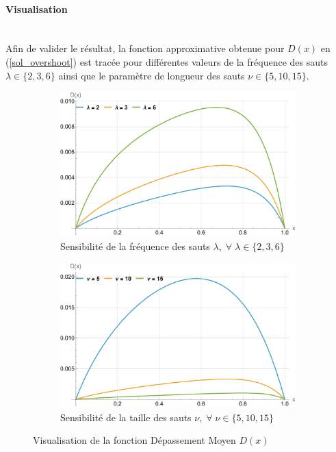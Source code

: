 \paragraph{Visualisation}\phantom{}\\
Afin de valider le résultat, la fonction approximative obtenue pour $D(x)$ en (\ref{sol_overshoot}) est tracée pour différentes valeurs de la fréquence des sauts $\lambda\in\{2,3,6\}$ ainsi que le paramètre de longueur des sauts $\nu\in\{5,10,15\}$.
\begin{figure}[htb]
    \centering
    \begin{subfigure}{0.45\linewidth}
        \includegraphics[width=\linewidth]{img/validation/Ovs/overshoot_lambda.pdf}
        \caption{Sensibilité de la fréquence des sauts $\lambda,\;\forall\;\lambda\in\{2,3,6\}$}\label{fig:Overshoot_lambda_visualisation}
    \end{subfigure}
    \hfill
    \begin{subfigure}{0.45\linewidth}
        \includegraphics[width=\linewidth]{img/validation/Ovs/overshoot_nu.pdf}
        \caption{Sensibilité de la taille des sauts $\nu,\;\forall\;\nu\in\{5,10,15\}$}\label{fig:Overshoot_nu_visualisation}
    \end{subfigure}
    \hfill
    \caption{Visualisation de la fonction Dépassement Moyen $D(x)$}\label{fig:OvershootVisualisation}
\end{figure}
